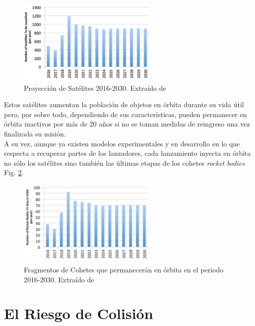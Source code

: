 \begin{figure}[!h]
  \centering
  \includegraphics[width=0.6\textwidth]{imagenes/satelxlanz}
  \caption[Proyecci\'on de Sat\'elites 2016-2030]{Proyecci\'on de Sat\'elites 2016-2030. Extra\'ido de \citep{karacalioglu2016impact}}
  \label{fig:satxlanz}
\end{figure}

Estos sat\'elites aumentan la poblaci\'on de objetos en \'orbita durante su vida \'util pero, por sobre todo, dependiendo de sus caracter\'isticas, pueden permanecer en \'orbita inactivos por m\'as de 20 a\~nos si no se toman medidas de reingreso una vez finalizada su misi\'on.\\
A su vez, aunque ya existen modelos experimentales y en desarrollo en lo que respecta a recuperar partes de los lanzadores, cada lanzamiento inyecta en \'orbita no s\'olo los sat\'elites sino tambi\'en las \'ultimas etapas de los cohetes {\it{rocket bodies}} Fig. \ref{fig:rocketbodies}.\\

\begin{figure}[!h]
  \centering
  \includegraphics[width=0.6\textwidth]{imagenes/rocketbodies}
  \caption[Fragmentos de Cohetes 2016-2030]{Fragmentos de Cohetes que permanecer\'an en \'orbita en el periodo 2016-2030. Extra\'ido de \cite{karacalioglu2016impact}}
  \label{fig:rocketbodies}
\end{figure}

\section{El Riesgo de Colisi\'on}

